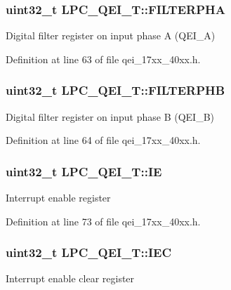 \subsubsection[{\texorpdfstring{F\+I\+L\+T\+E\+R\+P\+HA}{FILTERPHA}}]{ uint32\+\_\+t L\+P\+C\+\_\+\+Q\+E\+I\+\_\+\+T\+::\+F\+I\+L\+T\+E\+R\+P\+HA}\hypertarget{structLPC__QEI__T_ae8de561fff333fbf117036c7de063c36}{}\label{structLPC__QEI__T_ae8de561fff333fbf117036c7de063c36}
Digital filter register on input phase A (Q\+E\+I\+\_\+A) 

Definition at line 63 of file qei\+\_\+17xx\+\_\+40xx.\+h.

\subsubsection[{\texorpdfstring{F\+I\+L\+T\+E\+R\+P\+HB}{FILTERPHB}}]{ uint32\+\_\+t L\+P\+C\+\_\+\+Q\+E\+I\+\_\+\+T\+::\+F\+I\+L\+T\+E\+R\+P\+HB}\hypertarget{structLPC__QEI__T_a385bbf02e2aa20edde97366861e0ef8d}{}\label{structLPC__QEI__T_a385bbf02e2aa20edde97366861e0ef8d}
Digital filter register on input phase B (Q\+E\+I\+\_\+B) 

Definition at line 64 of file qei\+\_\+17xx\+\_\+40xx.\+h.

\subsubsection[{\texorpdfstring{IE}{IE}}]{ uint32\+\_\+t L\+P\+C\+\_\+\+Q\+E\+I\+\_\+\+T\+::\+IE}\hypertarget{structLPC__QEI__T_a89eace37d24d618b12322f0479b3aefd}{}\label{structLPC__QEI__T_a89eace37d24d618b12322f0479b3aefd}
Interrupt enable register 

Definition at line 73 of file qei\+\_\+17xx\+\_\+40xx.\+h.

\subsubsection[{\texorpdfstring{I\+EC}{IEC}}]{ uint32\+\_\+t L\+P\+C\+\_\+\+Q\+E\+I\+\_\+\+T\+::\+I\+EC}\hypertarget{structLPC__QEI__T_ad4164e0990c509994c19caccf1f7cf61}{}\label{structLPC__QEI__T_ad4164e0990c509994c19caccf1f7cf61}
Interrupt enable clear register 

